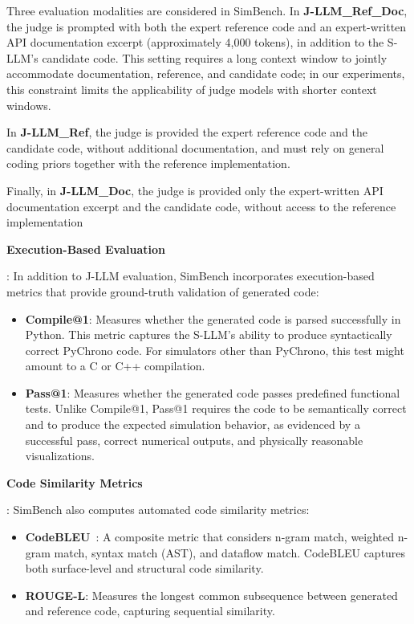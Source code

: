 \documentclass{ieeeaccess}
\newcommand{\noindentBold}[1]{\par\noindent\textbf{#1}}
\begin{document}
Three evaluation modalities are considered in SimBench.
In \textbf{J-LLM\_Ref\_Doc}, the judge is prompted with both the expert reference code and an expert-written API documentation excerpt (approximately 4{,}000 tokens), in addition to the S-LLM’s candidate code.
This setting requires a long context window to jointly accommodate documentation, reference, and candidate code; in our experiments, this constraint limits the applicability of judge models with shorter context windows.

In \textbf{J-LLM\_Ref}, the judge is provided the expert reference code and the candidate code, without additional documentation, and must rely on general coding priors together with the reference implementation.

Finally, in \textbf{J-LLM\_Doc}, the judge is provided only the expert-written API documentation excerpt and the candidate code, without access to the reference implementation

\medskip

{\noindentBold{Execution-Based Evaluation}}: In addition to J-LLM evaluation, SimBench incorporates execution-based metrics that provide ground-truth validation of generated code:

\begin{itemize}
    \item \textbf{Compile@1}: Measures whether the generated code is parsed successfully in Python. This metric captures the S-LLM's ability to produce syntactically correct PyChrono code. For simulators other than PyChrono, this test might amount to a C or C++ compilation.
    \item \textbf{Pass@1}: Measures whether the generated code passes predefined functional tests. Unlike Compile@1, Pass@1 requires the code to be semantically correct and to produce the expected simulation behavior, as evidenced by a successful pass, correct numerical outputs, and physically reasonable visualizations.
\end{itemize}

\medskip

{\noindentBold{Code Similarity Metrics}}: SimBench also computes automated code similarity metrics:

\begin{itemize}
    \item \textbf{CodeBLEU}~\cite{ren2020codebleu}: A composite metric that considers n-gram match, weighted n-gram match, syntax match (AST), and dataflow match. CodeBLEU captures both surface-level and structural code similarity.
    \item \textbf{ROUGE-L}: Measures the longest common subsequence between generated and reference code, capturing sequential similarity.
\end{itemize}
\end{document}
